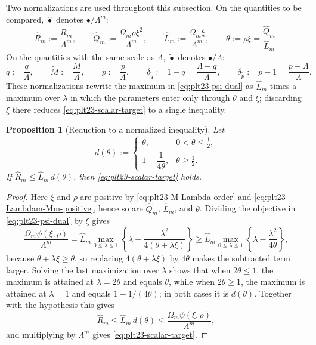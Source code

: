 ﻿\documentclass[11pt]{article}
\newtheorem{proposition}[theorem]{Proposition}
\numberwithin{equation}{section}
\begin{document}
Two normalizations are used throughout this subsection.
On the quantities to be compared, $\widehat\bullet$ denotes $\bullet/\Lambda^m$:
\begin{equation}\label{eq:plt23-AB-theta}
  \widehat R_m:=\frac{R_m}{\Lambda^m},
  \qquad
  \widehat Q_m:=\frac{\Omega_m\rho\xi^2}{\Lambda^m},
  \qquad
  \widehat L_m:=\frac{\Omega_m\xi}{\Lambda^m},
  \qquad
  \theta:=\rho\xi=\frac{\widehat Q_m}{\widehat L_m}.
\end{equation}
On the quantities with the same scale as $\Lambda$, $\tilde\bullet$ denotes $\bullet/\Lambda$:
\begin{equation}\label{eq:plt23-tilde-def}
  \tilde q:=\frac q\Lambda,
  \qquad
  \tilde M:=\frac M\Lambda,
  \qquad
  \tilde p:=\frac p\Lambda,
  \qquad
  \delta_{\tilde q}:=1-\tilde q=\frac{\Lambda-q}{\Lambda},
  \qquad
  \delta_{\tilde p}:=\tilde p-1=\frac{p-\Lambda}{\Lambda}.
\end{equation}
These normalizations rewrite the maximum in \eqref{eq:plt23-psi-dual} as $\widehat L_m$ times a maximum over $\lambda$ in which the parameters enter only through $\theta$ and $\xi$; discarding $\xi$ there reduces \eqref{eq:plt23-scalar-target} to a single inequality.

\begin{proposition}[Reduction to a normalized inequality]\label{prop:plt23-reduction}
  Let
  \begin{equation}\label{eq:plt23-dtheta}
    d(\theta):=
    \begin{cases}
      \theta, & 0<\theta\le\frac12,\\[1mm]
      1-\dfrac{1}{4\theta}, & \theta\ge\frac12.
    \end{cases}
  \end{equation}
  If $\widehat R_m\le\widehat L_m\,d(\theta)$, then \eqref{eq:plt23-scalar-target} holds.
\end{proposition}

\begin{proof}
  Here $\xi$ and $\rho$ are positive by \eqref{eq:plt23-M-Lambda-order} and \eqref{eq:plt23-Lambdam-Mm-positive}, hence so are $\widehat Q_m$, $\widehat L_m$, and $\theta$.
  Dividing the objective in \eqref{eq:plt23-psi-dual} by $\xi$ gives
  \[
    \frac{\Omega_m\psi(\xi,\rho)}{\Lambda^m}
    =\widehat L_m
      \max_{0\le\lambda\le 1}
        \left\{\lambda-\frac{\lambda^2}{4(\theta+\lambda\xi)}\right\}
    \ge
      \widehat L_m
      \max_{0\le\lambda\le 1}
        \left\{\lambda-\frac{\lambda^2}{4\theta}\right\},
  \]
  because $\theta+\lambda\xi\ge\theta$, so replacing $4(\theta+\lambda\xi)$ by $4\theta$ makes the subtracted term larger.
  Solving the last maximization over $\lambda$ shows that when $2\theta \le 1$, the maximum is attained at $\lambda=2\theta$ and equals $\theta$, while when $2\theta \ge 1$, the maximum is attained at $\lambda=1$ and equals $1-1/(4\theta)$; in both cases it is $d(\theta)$.
  Together with the hypothesis this gives
  \[
    \widehat R_m
    \le\widehat L_m\,d(\theta)
    \le\frac{\Omega_m\psi(\xi,\rho)}{\Lambda^m},
  \]
  and multiplying by $\Lambda^m$ gives \eqref{eq:plt23-scalar-target}.
\end{proof}
\end{document}
